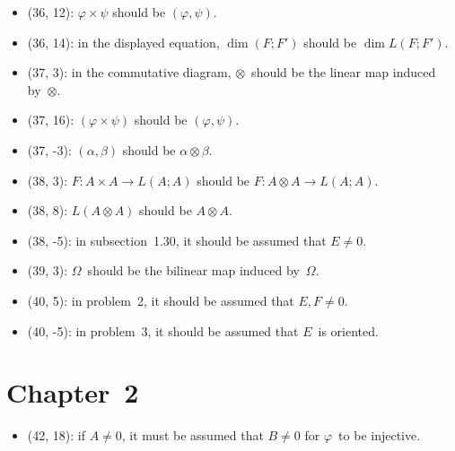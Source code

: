 \documentclass[letterpaper,12pt]{article}
\newcommand{\tprod}{\otimes}
\begin{document}
\begin{itemize}
\item (36, 12): \(\varphi\times\psi\) should be \((\varphi,\psi)\).
\item (36, 14): in the displayed equation, \(\dim(F;F')\) should be \(\dim L(F;F')\).
\item (37, 3): in the commutative diagram, \(\tprod\)~should be the linear map induced by~\(\tprod\).
\item (37, 16): \((\varphi\times\psi)\) should be \((\varphi,\psi)\).
\item (37, -3): \((\alpha,\beta)\) should be \(\alpha\tprod\beta\).
\item (38, 3): \(F:A\times A\to L(A;A)\) should be \(F:A\tprod A\to L(A;A)\).
\item (38, 8): \(L(A\tprod A)\) should be \(A\tprod A\).
\item (38, -5): in subsection~1.30, it should be assumed that \(E\ne 0\).
\item (39, 3): \(\Omega\)~should be the bilinear map induced by~\(\Omega\).
\item (40, 5): in problem~2, it should be assumed that \(E,F\ne 0\).
\item (40, -5): in problem~3, it should be assumed that \(E\)~is oriented.
\end{itemize}

\section*{Chapter~2}
\begin{itemize}
\item (42, 18): if \(A\ne 0\), it must be assumed that \(B\ne 0\) for \(\varphi\)~to be injective.
\end{itemize}
\end{document}
